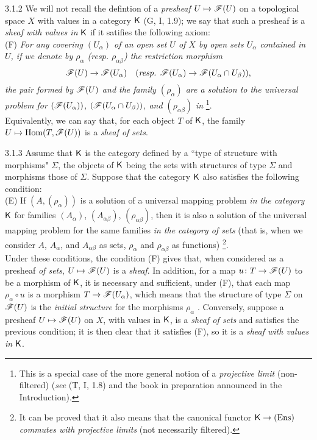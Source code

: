 \documentclass{book}
\begin{document}
\begin{env}{3.1.2}
\label{env-0.3.1.2}
We will not recall the defintion of a \emph{presheaf} $U\mapsto\mathscr{F}(U)$ on a
topological space $X$ with values in a category $\mathsf{K}$ (G, I, 1.9); we say that
such a presheaf is a \emph{sheaf with values in} $\mathsf{K}$ if it satifies the following
axiom:\\

(F) \emph{For any covering $(U_\alpha)$ of an open set $U$ of $X$ by open sets
   $U_\alpha$ contained in $U$, if we denote by $\rho_\alpha$ (resp. $\rho_{\alpha\beta}$) the
   restriction morphism}
   \[
     \mathscr{F}(U)\to\mathscr{F}(U_\alpha)\quad(\text{\emph{resp. }}\mathscr{F}(U_\alpha)\to\mathscr{F}(U_\alpha\cap U_\beta)),
   \]
   \emph{the pair formed by $\mathscr{F}(U)$ and the family $(\rho_\alpha)$ are a solution to
   the universal problem for $(\mathscr{F}(U_\alpha))$, $(\mathscr{F}(U_\alpha\cap U_\beta))$, and $(\rho_{\alpha\beta})$
   in} \footnote{This is a special case of the more general notion of a
   \emph{projective limit} (non-filtered) (\emph{see} (T, I, 1.8) and the book in
   preparation announced in the Introduction).}.\\

Equivalently, we can say that, for each object $T$ of $\mathsf{K}$, the family
$U\mapsto{\mathop{\mathrm{Hom}}\nolimits}(T,\mathscr{F}(U))$ is a \emph{sheaf of sets}.
\end{env}

\begin{env}{3.1.3}
\label{env-0.3.1.3}
Assume that $\mathsf{K}$ is the category defined by a ``type of structure
with morphisms" $\Sigma$, the objects of $\mathsf{K}$ being the sets with structures
of type $\Sigma$ and morphisms those of $\Sigma$. Suppose that the category $\mathsf{K}$ also satisfies
the following condition:\\

(E) If $(A,(\rho_\alpha))$ is a solution of a universal mapping problem \emph{in the category} $\mathsf{K}$
for families $(A_\alpha)$, $(A_{\alpha\beta})$, $(\rho_{\alpha\beta})$, then it is also a solution of the
universal mapping problem for the same families \emph{in the category of sets} (that is, when we
consider $A$, $A_\alpha$, and $A_{\alpha\beta}$ as sets, $\rho_\alpha$ and $\rho_{\alpha\beta}$ as functions)
\footnote{It can be proved that it also means that the canonical functor $\mathsf{K}\to(\mathrm{Ens})$
\emph{commutes with projective limits} (not necessarily filtered).}.\\

Under these conditions, the condition (F) gives that, when considered as a presheaf
\emph{of sets}, $U\mapsto\mathscr{F}(U)$ is a \emph{sheaf}. In addition, for a map $u\colon T\to\mathscr{F}(U)$
to be a morphism of $\mathsf{K}$, it is necessary and sufficient, under (F), that each map $\rho_\alpha\circ u$
is a morphism $T\to\mathscr{F}(U_\alpha)$, which means that the structure of type $\Sigma$ on $\mathscr{F}(U)$
is the \emph{initial structure} for the morphisms $\rho_\alpha$ . Conversely, suppose a presheaf
$U\mapsto\mathscr{F}(U)$ on $X$, with values in $\mathsf{K}$, is a \emph{sheaf of sets} and satisfies the previous
condition; it is then clear that it satisfies (F), so it is a \emph{sheaf with values in} $\mathsf{K}$.
\end{env}
\end{document}
